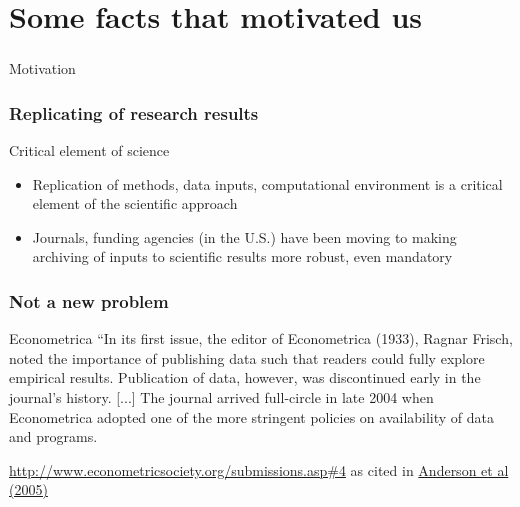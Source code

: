 
%
%
%
\section[Motivation]{Some facts that motivated us}

\begin{frame}
\frametitle{}
\begin{block}{Motivation}

\end{block}
\end{frame}

\begin{frame}
\frametitle{Replicating of research results}
\begin{block}{Critical element of science}
\begin{itemize}
\item Replication of methods, data inputs, computational environment is a critical element of the scientific approach
\item Journals, funding agencies (in the U.S.) have been moving to making archiving of inputs to scientific results more robust, even mandatory
\end{itemize}
\end{block}
\end{frame}

\begin{frame}
\frametitle{Not a new problem}
\begin{block}{Econometrica}
``In its first issue, the editor of Econometrica (1933), Ragnar Frisch, noted
the importance of publishing data such that readers could fully explore
empirical results.  Publication of data, however, was discontinued early in
the journal's history.  [...]  The journal arrived full-circle in late 2004 when Econometrica
adopted one of the more stringent policies on availability of data and
programs.
\end{block}
\tiny \href{http://www.econometricsociety.org/submissions.asp\#4}{http://www.econometricsociety.org/submissions.asp\#4} as cited in \href{http://research.stlouisfed.org/wp/2005/2005-014.pdf}{Anderson et al (2005)}
\end{frame}

